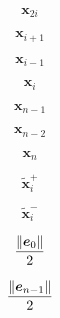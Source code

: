 \documentclass[a4paper,11pt,fleqn]{book}
\newcommand{\vect}[1]{\boldsymbol{#1}}
\DeclarePairedDelimiter\norm{\lVert}{\rVert}
\begin{document}
\begin{equation}
\vect{x}_{2i}
\end{equation}


\begin{equation}
\vect{x}_{i+1}
\end{equation}


\begin{equation}
\vect{x}_{i-1}
\end{equation}


\begin{equation}
\vect{x}_i
\end{equation}


\begin{equation}
\vect{x}_{n-1}
\end{equation}


\begin{equation}
\vect{x}_{n-2}
\end{equation}


\begin{equation}
\vect{x}_n
\end{equation}


\begin{equation}
\tilde{\vect{x}}_i^+
\end{equation}


\begin{equation}
\tilde{\vect{x}}_i^-
\end{equation}


\begin{equation}
\frac{\norm{\vect{e}_0}}{2}
\end{equation}


\begin{equation}
\frac{\norm{\vect{e}_{n-1}}}{2}
\end{equation}
\end{document}
